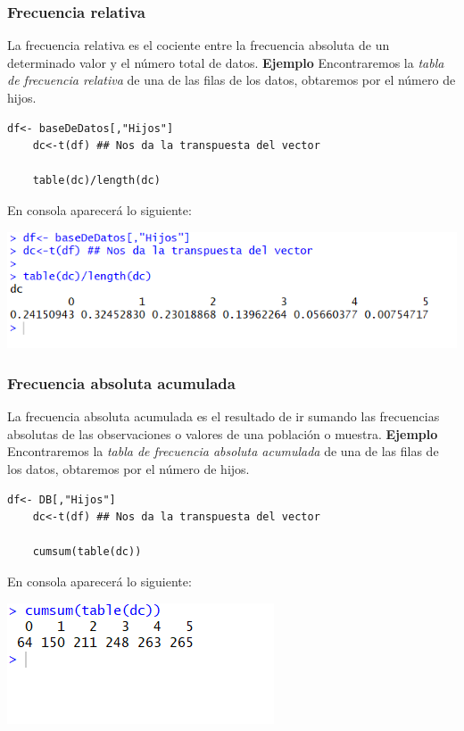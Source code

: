 \documentclass[12pt,hidelinks]{article}
\begin{document}
	\subsubsection{Frecuencia relativa}
	La frecuencia relativa es el cociente entre la frecuencia absoluta de un determinado valor y el número total de datos. \textbf{Ejemplo} Encontraremos la \textit{tabla de frecuencia relativa} de una de las filas de los datos, obtaremos por el número de hijos.
	\begin{lstlisting}[frame=single]
	df<- baseDeDatos[,"Hijos"]
	dc<-t(df) ## Nos da la transpuesta del vector
	
	table(dc)/length(dc)
	\end{lstlisting}
	En consola aparecerá lo siguiente:
	\begin{center}
		\includegraphics[width=\linewidth]{images/2/TFrelativa.PNG}
	\end{center}
	\subsubsection{Frecuencia absoluta acumulada}
	La frecuencia absoluta acumulada es el resultado de ir sumando las frecuencias absolutas de las observaciones o valores de una población o muestra. \textbf{Ejemplo} Encontraremos la \textit{tabla de frecuencia absoluta acumulada} de una de las filas de los datos, obtaremos por el número de hijos.
	\begin{lstlisting}[frame=single]
	df<- DB[,"Hijos"]
	dc<-t(df) ## Nos da la transpuesta del vector
	
	cumsum(table(dc))
	\end{lstlisting}
	En consola aparecerá lo siguiente:
	\begin{center}
		\includegraphics[]{images/2/TFabsolutaAcum.PNG}
	\end{center}
\end{document}
